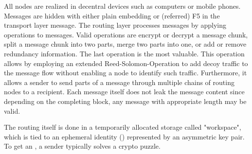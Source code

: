 All nodes are realized in decentral devices such as computers or mobile phones. Messages are hidden with either plain embedding or (referred) F5 in the transport layer message. The routing layer processes messages by applying operations to messages. Valid operations are encrypt or decrypt a message chunk, split a message chunk into two parts, merge two parts into one, or add or remove redundancy information. The last operation is the most valuable. This operation allows by employing an extended Reed-Solomon-Operation to add decoy traffic to the message flow without enabling a node to identify such traffic. Furthermore, it allows a sender to send parts of a message through multiple chains of routing nodes to a recipient. Each message itself does not leak the message content since depending on the completing block, any message with appropriate length may be valid.

The routing itself is done in a temporarily allocated storage called "workspace", which is tied to an ephemeral identity () represented by an asymmetric key pair. To get an , a sender typically solves a crypto puzzle.






